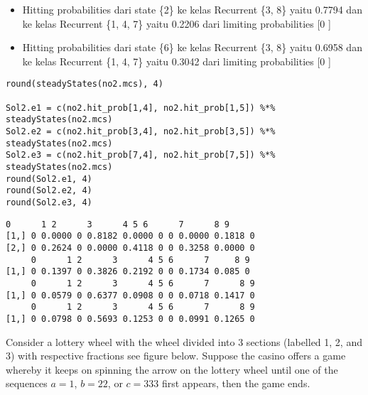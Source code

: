 \documentclass[answers]{exam}
\begin{document}
\begin{questions}
\begin{parts}
\begin{solution}
\begin{itemize}
\begin{itemize}
                            \item Hitting probabilities dari state \{2\} ke kelas Recurrent \{3, 8\} yaitu 0.7794 dan ke kelas Recurrent \{1, 4, 7\} yaitu 0.2206 dari limiting probabilities [0         ]
                            \item Hitting probabilities dari state \{6\} ke kelas Recurrent \{3, 8\} yaitu 0.6958 dan ke kelas Recurrent \{1, 4, 7\} yaitu 0.3042 dari limiting probabilities [0         ]
                        \end{itemize}
                    \end{itemize}
                \end{solution}
                \begin{minipage}[t]{.9\textwidth}
                    \begin{lstlisting}[title=Code]
round(steadyStates(no2.mcs), 4)

Sol2.e1 = c(no2.hit_prob[1,4], no2.hit_prob[1,5]) %*% steadyStates(no2.mcs)
Sol2.e2 = c(no2.hit_prob[3,4], no2.hit_prob[3,5]) %*% steadyStates(no2.mcs)
Sol2.e3 = c(no2.hit_prob[7,4], no2.hit_prob[7,5]) %*% steadyStates(no2.mcs)
round(Sol2.e1, 4)
round(Sol2.e2, 4)
round(Sol2.e3, 4)
                    \end{lstlisting}
                \end{minipage}
                \newline
                \begin{minipage}[t]{.9\textwidth}
                    \begin{lstlisting}[title=Output]
     0      1 2      3      4 5 6      7      8 9
[1,] 0 0.0000 0 0.8182 0.0000 0 0 0.0000 0.1818 0
[2,] 0 0.2624 0 0.0000 0.4118 0 0 0.3258 0.0000 0
     0      1 2      3      4 5 6      7     8 9
[1,] 0 0.1397 0 0.3826 0.2192 0 0 0.1734 0.085 0
     0      1 2      3      4 5 6      7      8 9
[1,] 0 0.0579 0 0.6377 0.0908 0 0 0.0718 0.1417 0
     0      1 2      3      4 5 6      7      8 9
[1,] 0 0.0798 0 0.5693 0.1253 0 0 0.0991 0.1265 0
                    \end{lstlisting}
                \end{minipage}
        \end{parts}

    \question Consider a lottery wheel with the wheel divided into 3 sections (labelled 1, 2, and 3) with respective fractions see figure below. Suppose the casino offers a game whereby it keeps on spinning the arrow on the lottery wheel until one of the sequences $a = 1$, $b = 22$, or $c = 333$ first appears, then the game ends.
        \begin{parts}

\end{parts}
\end{questions}
\end{document}
